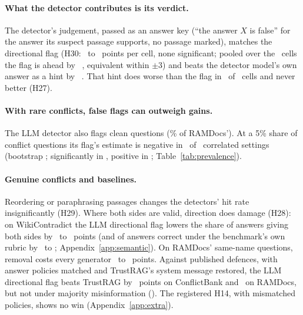 \paragraph{What the detector contributes is its verdict.} The detector's judgement, passed as an answer key (``the
answer $X$ is false'' for the answer its suspect passage supports, no passage marked), matches the directional flag
(H30: \hThirtyAMin\ to \hThirtyAMax\ points per cell, none significant; pooled over the \PoolThirtyAK\ cells the flag
is ahead by \PoolThirtyA\ \PoolThirtyACI, equivalent within $\pm$3) and beats the detector model's own answer as a
hint by \PoolThirtyB\ \PoolThirtyBCI. That hint does worse than the flag in \nHTwentySevenAPos\ of
\nHTwentySevenATests\ cells and never better (H27).

\paragraph{With rare conflicts, false flags can outweigh gains.} The LLM detector also flags clean questions
(\cleanFprLlm\% of RAMDocs'). At a 5\% share of conflict questions its flag's estimate is negative in \prevNegFive\ of \prevN\ correlated settings
(bootstrap \prevNegFiveCI; significantly in \prevSigNeg, positive in \prevSigPos; Table~\ref{tab:prevalence}).

\paragraph{Genuine conflicts and baselines.} Reordering \citep{liu2024lost} or paraphrasing passages changes the
detectors' hit rate insignificantly (H29). Where both sides are valid, direction does damage (H28): on WikiContradict the LLM directional
flag lowers the share of answers giving both sides by \ahTwentyEightWcMiniDir\ to \ahTwentyEightWcLunaDir\ points
(and of answers correct under the benchmark's own rubric by \awikiOrigMiniEffPt\ to \awikiOrigLunaEffPt;
Appendix~\ref{app:semantic}). On RAMDocs' same-name questions, removal costs every generator
\ahTwentyEightAmbMiniRem\ to \ahTwentyEightAmbLunaRem\ points. Against published defences, with answer policies matched and TrustRAG's
system message restored, the LLM directional flag beats TrustRAG by \blHFourteenCbs\ points on ConflictBank and
\blHFourteenRd\ on RAMDocs, but not under majority misinformation (\blHFourteenMj). The registered H14, with
mismatched policies, shows no win (Appendix~\ref{app:extra}).
